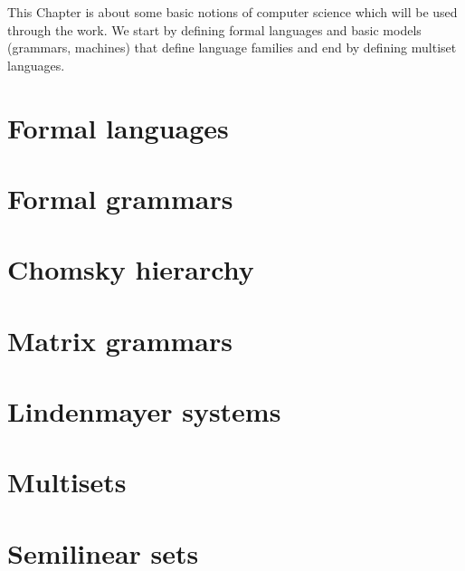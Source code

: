This Chapter is about some basic notions of computer science which will be used through the work. We start by defining formal languages and basic models (grammars, machines) that define language families and end by defining multiset languages.

\section{Formal languages} %
\label{sec:formal_languages}



\section{Formal grammars} %
\label{sec:formal_grammars}



\section{Chomsky hierarchy} %
\label{sec:chomsky_hierarchy}



\section{Matrix grammars} %
\label{sec:matrix_grammars}



\section{Lindenmayer systems} %
\label{sec:lindenmayer_systems}



\section{Multisets} %
\label{sec:multisets}



\section{Semilinear sets} %
\label{sec:semilinear_sets}


